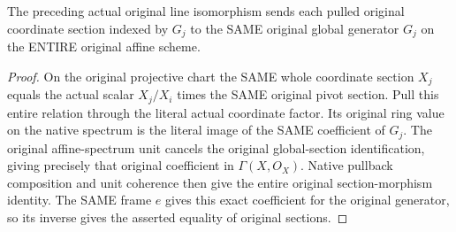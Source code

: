\begin{theorem}
\label{thm:fc-generated-line-affine-twist-sections}
\leanok
{}
The preceding actual original line isomorphism sends each pulled
original coordinate section indexed by $G_j$ to the SAME original
global generator $G_j$ on the ENTIRE original affine scheme.
\end{theorem}
\begin{proof}
On the original projective chart the SAME whole coordinate section
$X_j$ equals the actual scalar $X_j/X_i$ times the SAME original
pivot section. Pull this entire relation through the literal actual
coordinate factor. Its original ring value on the native
spectrum is the literal image of the SAME coefficient of $G_j$.
The original affine-spectrum unit cancels the original global-section
identification, giving precisely that original coefficient in
$\Gamma(X,O_X)$. Native pullback composition and unit coherence
then give the entire original section-morphism identity. The SAME
frame $e$ gives this exact coefficient for the original generator,
so its inverse gives the asserted equality of original sections.
\end{proof}
